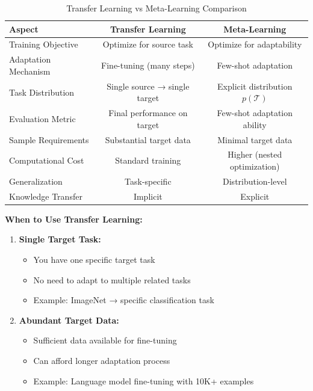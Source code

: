 \documentclass[12pt]{article}
\newcommand{\ieee}[1]{\textcolor{IEEEBlue}{\textbf{#1}}}
\begin{document}
{{			\begin{table}[H]
			\centering
			\caption{Transfer Learning vs Meta-Learning Comparison}
			\begin{tabular}{@{}lcc@{}}
			\toprule
			\textbf{Aspect} & \textbf{Transfer Learning} & \textbf{Meta-Learning} \\
			\midrule
			Training Objective & Optimize for source task & Optimize for adaptability \\
			Adaptation Mechanism & Fine-tuning (many steps) & Few-shot adaptation \\
			Task Distribution & Single source → single target & Explicit distribution $p(\mathcal{T})$ \\
			Evaluation Metric & Final performance on target & Few-shot adaptation ability \\
			Sample Requirements & Substantial target data & Minimal target data \\
			Computational Cost & Standard training & Higher (nested optimization) \\
			Generalization & Task-specific & Distribution-level \\
			Knowledge Transfer & Implicit & Explicit \\
			\bottomrule
			\end{tabular}
			\label{tab:transfer_vs_meta}
			\end{table}
			
			\ieee{When to Use Transfer Learning:}
			
			\begin{enumerate}
				\item \textbf{Single Target Task:}
				\begin{itemize}
					\item You have one specific target task
					\item No need to adapt to multiple related tasks
					\item Example: ImageNet → specific classification task
				\end{itemize}
				
				\item \textbf{Abundant Target Data:}
				\begin{itemize}
					\item Sufficient data available for fine-tuning
					\item Can afford longer adaptation process
					\item Example: Language model fine-tuning with 10K+ examples
				\end{itemize}
				

\end{enumerate}}}
\end{document}
